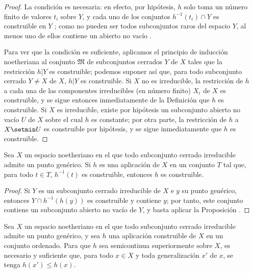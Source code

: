 \documentclass[oneside]{amsart}
\renewcommand{\leq}{\leqslant}
\newcommand{\oldpage}[2][]{{\marginnote{\normalfont\textbf{#1}~|~#2}}\ignorespaces}
\let\EGAOriginalLabel\label
\renewcommand{\label}[1]{\phantomsection\EGAOriginalLabel{#1}}
\begin{document}
\begin{proof}
La condición es necesaria: en efecto, por hipótesis, $h$ solo toma un número finito de valores $t_i$ sobre $Y$, y cada uno de los conjuntos $h^{-1}(t_i)\cap Y$ es construible en $Y$ ; como no pueden ser todos subconjuntos raros del espacio $Y$, al menos uno de ellos contiene un abierto no vacío .

\oldpage[0\textsubscript{III}]{17}
Para ver que la condición es suficiente, aplicamos el principio de inducción noetheriana al conjunto $\mathfrak{M}$ de subconjuntos cerrados $Y$ de $X$ tales que la restricción $h|Y$ es construible; podemos suponer así que, para todo subconjunto cerrado $Y\neq X$ de $X$,
$h|Y$ es construible.
Si $X$ no es irreducible, la restricción de $h$ a cada una de las componentes irreducibles (en número finito) $X_i$ de $X$ es construible, y se sigue entonces inmediatamente de la Definición  que $h$ es construible.
Si $X$ es irreducible, existe por hipótesis un subconjunto abierto no vacío $U$ de $X$ sobre el cual $h$ es constante; por otra parte, la restricción de $h$ a $X\setmin U$ es construible por hipótesis, y se sigue inmediatamente que $h$ es construible.
\end{proof}

\begin{corollary}[9.3.3]
\label{0.9.3.3}
Sea $X$ un espacio noetheriano en el que todo subconjunto cerrado irreducible admite un punto genérico.
Si $h$ es una aplicación de $X$ en un conjunto $T$ tal que, para todo $t\in T$, $h^{-1}(t)$ es construible, entonces $h$ es construible.
\end{corollary}

\begin{proof}
Si $Y$ es un subconjunto cerrado irreducible de $X$ e $y$ su punto genérico, entonces $Y\cap h^{-1}(h(y))$ es construible y contiene $y$; por tanto,  este conjunto contiene un subconjunto abierto no vacío de $Y$, y basta aplicar la Proposición .
\end{proof}

\begin{proposition}[9.3.4]
\label{0.9.3.4}
Sea $X$ un espacio noetheriano en el que todo subconjunto cerrado irreducible admite un punto genérico, y sea $h$ una aplicación construible de $X$ en un conjunto ordenado.
Para que $h$ sea semicontinua superiormente sobre $X$, es necesario y suficiente que, para todo $x\in X$ y toda generalización  $x'$ de $x$, se tenga $h(x')\leq h(x)$.
\end{proposition}
\end{document}
